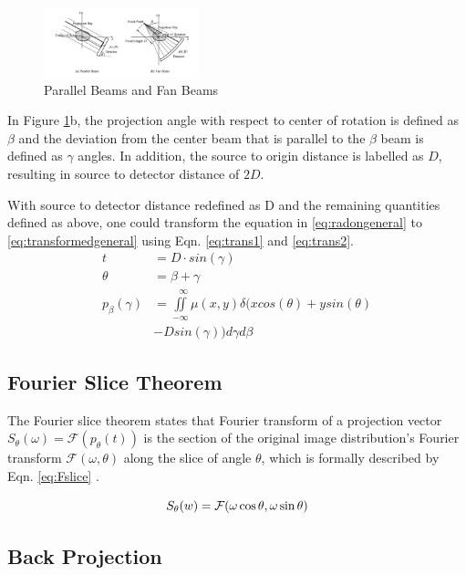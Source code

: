 \documentclass[journal]{IEEEtran}
\begin{document}
\begin{figure}[h]
\centering
\includegraphics[width=0.4\textwidth]{images/PvsB.jpg}
\caption{Parallel Beams and Fan Beams \cite{zeng2017image}}\label{fig:PvsB}
\end{figure}

In Figure \ref{fig:PvsB}b, the projection angle with respect to center of rotation is defined as $\beta$ and the deviation from the center beam that is parallel to the $\beta$ beam is defined as $\gamma$ angles. In addition, the source to origin distance is labelled as $D$, resulting in source to detector distance of $2D$. 

With source to detector distance redefined as D and the remaining quantities defined as above, one could transform the equation in \ref{eq:radongeneral} to \ref{eq:transformedgeneral} using Eqn. \ref{eq:trans1} and \ref{eq:trans2}.
\begin{align}
	t &= D \cdot sin(\gamma) \label{eq:trans1} \\
	\theta &= \beta + \gamma \label{eq:trans2} \\
	p_{\beta}(\gamma) &= \iint\limits_{-\infty}^{\ \ \ \infty}\mu(x,y)\delta(xcos(\theta)+ysin(\theta) \label{eq:transformedgeneral} \\&-Dsin(\gamma))d\gamma d\beta \nonumber 
\end{align}

\subsection{Fourier Slice Theorem}

The Fourier slice theorem states that Fourier transform of a projection vector $S_{\theta}(\omega) = \mathcal{F}(p_{\theta}(t))$ is the section of the original image distribution's Fourier transform $\mathcal{F}(\omega,\theta)$ along the slice of angle $\theta$, which is formally described by Eqn. \ref{eq:Fslice} \cite{kak2001principles}.

\begin{equation}
	S_{\theta}(w) = \cal{F}(\omega\cos\theta,\omega\sin\theta)
	\label{eq:Fslice}
\end{equation}

\subsection{Back Projection}
\end{document}
